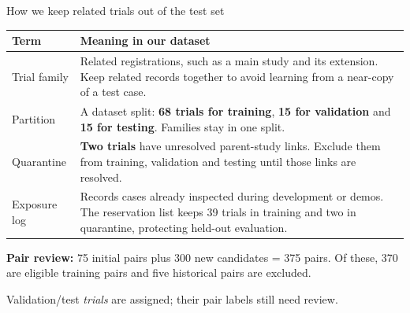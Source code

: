 \documentclass[aspectratio=169,11pt]{beamer}
\newcommand{\gap}{\par\vspace{.55em}}
\begin{document}
\begin{frame}{How we keep related trials out of the test set}
\begingroup\small
\begin{tabularx}{\textwidth}{@{}p{}Y@{}}
\toprule
Term & Meaning in our dataset\\\midrule
Trial family & Related registrations, such as a main study and its extension. Keep related records together to avoid learning from a near-copy of a test case.\\
Partition & A dataset split: \textbf{68 trials for training}, \textbf{15 for validation} and \textbf{15 for testing}. Families stay in one split.\\
Quarantine & \textbf{Two trials} have unresolved parent-study links. Exclude them from training, validation and testing until those links are resolved.\\
Exposure log & Records cases already inspected during development or demos. The reservation list keeps 39 trials in training and two in quarantine, protecting held-out evaluation.\\\bottomrule
\end{tabularx}
\endgroup
\gap
\textbf{Pair review:} 75 initial pairs plus 300 new candidates = 375 pairs.
Of these, 370 are eligible training pairs and five historical pairs are excluded.
\gap
{\small Validation/test \emph{trials} are assigned; their pair labels still need review.}
\end{frame}
\end{document}

